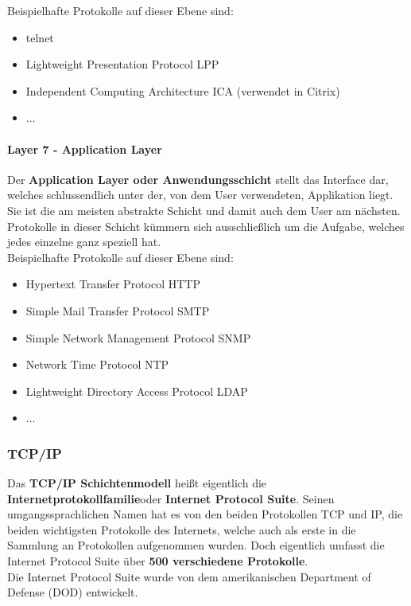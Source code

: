 \documentclass[12pt,a4paper]{report}
\begin{document}
Beispielhafte Protokolle auf dieser Ebene sind:
\begin{itemize}
\item telnet
\item Lightweight Presentation Protocol LPP
\item Independent Computing Architecture ICA (verwendet in Citrix)
\item ...
\end{itemize}

\paragraph{Layer 7 - Application Layer}
Der \textbf{Application Layer oder Anwendungsschicht} stellt das Interface dar, welches schlussendlich unter der, von dem User verwendeten, Applikation liegt. Sie ist die am meisten abstrakte Schicht und damit auch dem User am nächsten. Protokolle in dieser Schicht kümmern sich ausschließlich um die Aufgabe, welches jedes einzelne ganz speziell hat.\\

Beispielhafte Protokolle auf dieser Ebene sind:
\begin{itemize}
\item Hypertext Transfer Protocol HTTP
\item Simple Mail Transfer Protocol SMTP
\item Simple Network Management Protocol SNMP
\item Network Time Protocol NTP
\item Lightweight Directory Access Protocol LDAP
\item ...
\end{itemize}
\subsubsection{TCP/IP}\label{sssec:tcpip}
Das \textbf{TCP/IP Schichtenmodell} heißt eigentlich die \glqq \textbf{Internetprotokollfamilie}\grqq  oder \glqq \textbf{Internet Protocol Suite}\grqq . Seinen umgangssprachlichen Namen hat es von den beiden Protokollen TCP und IP, die beiden wichtigsten Protokolle des Internets, welche auch als erste in die Sammlung an Protokollen aufgenommen wurden. Doch eigentlich umfasst die Internet Protocol Suite über \textbf{500 verschiedene Protokolle}.\\
Die Internet Protocol Suite wurde von dem amerikanischen Department of Defense (DOD) entwickelt.\\
\end{document}
